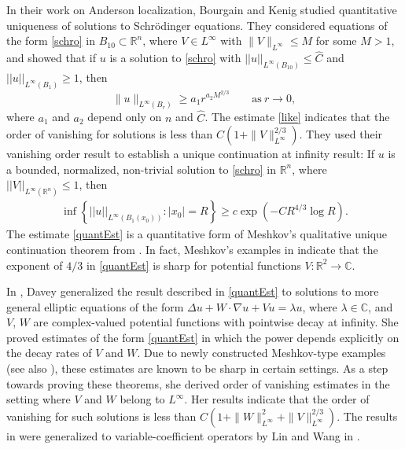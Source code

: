 \documentclass[11pt]{amsart}
\theoremstyle{plain}
\numberwithin{equation}{section}
\begin{document}
In their work on Anderson localization, Bourgain and Kenig \cite{BK05} studied quantitative uniqueness of solutions to Schr\"odinger equations.
They considered equations of the form \eqref{schro} in $B_{10} {\subset} {\ensuremath{\mathbb{R}}}^n$, where $V \in L^\infty$ with $\|V\|_{L^\infty}\leq M$ for some $M > 1$, and showed that if $u$ is a solution to \eqref{schro} with ${\left\vert\left\vert {u}\right\vert\right\vert}_{L^{\infty}{\left( {B_{10}} \right) }} \le \hat C$ and ${\left\vert\left\vert {u}\right\vert\right\vert}_{L^{\infty}{\left( {B_1} \right) }}\geq 1$, then
\begin{equation}
\|u\|_{L^\infty (B_r)}\geq a_1r^{a_2 M^{2/3}} \quad
\quad \mbox{as}\ r\to 0, \label{like}
\end{equation}
 where $a_1$ and $a_2$ depend only on $n$ and $\hat{C}$.
The estimate \eqref{like} indicates that the order of vanishing for solutions is less than $C(1+\|V\|_{L^\infty}^{2/3})$.
They used their vanishing order result to establish a unique continuation at infinity result: If $u$ is a bounded, normalized, non-trivial solution to \eqref{schro} in ${\ensuremath{\mathbb{R}}}^n$, where ${\left\vert\left\vert {V}\right\vert\right\vert}_{L^{\infty}{\left( {{\ensuremath{\mathbb{R}}}^n} \right) }} \le 1$, then
\begin{align}
\inf{\left\{{{\left\vert\left\vert {u}\right\vert\right\vert}_{L^{\infty}{\left( {B_1{\left( {x_0} \right) }} \right) }} : {\left\vert{x_0}\right\vert} = R}\right\}} \ge c \exp{\left( {- C R^{4/3} \log R} \right) }.
\label{quantEst}
\end{align}
The estimate \eqref{quantEst} is a quantitative form of Meshkov's qualitative unique continuation theorem from \cite{Mes92}.
In fact, Meshkov's examples in \cite{Mes92} indicate that the exponent of $4/3$ in \eqref{quantEst} is sharp for potential functions $V : {\ensuremath{\mathbb{R}}}^2 \to {\ensuremath{\mathbb{C}}}$.

In \cite{Dav14}, Davey generalized the result described in \eqref{quantEst} to solutions to more general elliptic equations of the form ${\Delta} u + W \cdot {\nabla} u + V u = {\lambda} u$, where ${\lambda} \in {\ensuremath{\mathbb{C}}}$, and $V$, $W$ are complex-valued potential functions with pointwise decay at infinity.
She proved estimates of the form \eqref{quantEst} in which the power depends explicitly on the decay rates of $V$ and $W$.
Due to newly constructed Meshkov-type examples (see also \cite{Dav15}), these estimates are known to be sharp in certain settings.
As a step towards proving these theorems, she derived order of vanishing estimates in the setting where $V$ and $W$ belong to $L^{\infty}$.
Her results indicate that the order of vanishing for such solutions is less than $C(1+\|W\|_{L^\infty}^{2}+\|V\|_{L^\infty}^{2/3})$.
The results in \cite{Dav14} were generalized to variable-coefficient operators by Lin and Wang in \cite{LW14}.
\end{document}
